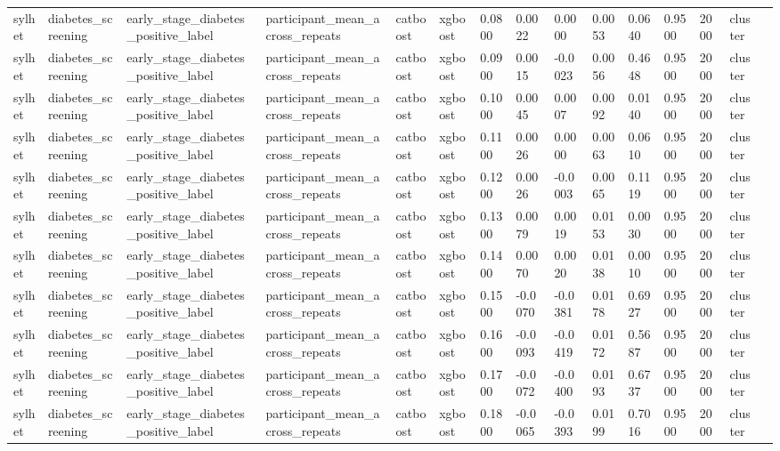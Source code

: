 \begin{tabular}{lllllllllllllll}
sylhet & diabetes\_screening & early\_stage\_diabetes\_positive\_label & participant\_mean\_across\_repeats & catboost & xgboost & 0.0800 & 0.0022 & 0.0000 & 0.0053 & 0.0640 & 0.9500 & 2000 & cluster &  \\
sylhet & diabetes\_screening & early\_stage\_diabetes\_positive\_label & participant\_mean\_across\_repeats & catboost & xgboost & 0.0900 & 0.0015 & -0.0023 & 0.0056 & 0.4648 & 0.9500 & 2000 & cluster &  \\
sylhet & diabetes\_screening & early\_stage\_diabetes\_positive\_label & participant\_mean\_across\_repeats & catboost & xgboost & 0.1000 & 0.0045 & 0.0007 & 0.0092 & 0.0140 & 0.9500 & 2000 & cluster &  \\
sylhet & diabetes\_screening & early\_stage\_diabetes\_positive\_label & participant\_mean\_across\_repeats & catboost & xgboost & 0.1100 & 0.0026 & 0.0000 & 0.0063 & 0.0610 & 0.9500 & 2000 & cluster &  \\
sylhet & diabetes\_screening & early\_stage\_diabetes\_positive\_label & participant\_mean\_across\_repeats & catboost & xgboost & 0.1200 & 0.0026 & -0.0003 & 0.0065 & 0.1119 & 0.9500 & 2000 & cluster &  \\
sylhet & diabetes\_screening & early\_stage\_diabetes\_positive\_label & participant\_mean\_across\_repeats & catboost & xgboost & 0.1300 & 0.0079 & 0.0019 & 0.0153 & 0.0030 & 0.9500 & 2000 & cluster &  \\
sylhet & diabetes\_screening & early\_stage\_diabetes\_positive\_label & participant\_mean\_across\_repeats & catboost & xgboost & 0.1400 & 0.0070 & 0.0020 & 0.0138 & 0.0010 & 0.9500 & 2000 & cluster &  \\
sylhet & diabetes\_screening & early\_stage\_diabetes\_positive\_label & participant\_mean\_across\_repeats & catboost & xgboost & 0.1500 & -0.0070 & -0.0381 & 0.0178 & 0.6927 & 0.9500 & 2000 & cluster &  \\
sylhet & diabetes\_screening & early\_stage\_diabetes\_positive\_label & participant\_mean\_across\_repeats & catboost & xgboost & 0.1600 & -0.0093 & -0.0419 & 0.0172 & 0.5687 & 0.9500 & 2000 & cluster &  \\
sylhet & diabetes\_screening & early\_stage\_diabetes\_positive\_label & participant\_mean\_across\_repeats & catboost & xgboost & 0.1700 & -0.0072 & -0.0400 & 0.0193 & 0.6737 & 0.9500 & 2000 & cluster &  \\
sylhet & diabetes\_screening & early\_stage\_diabetes\_positive\_label & participant\_mean\_across\_repeats & catboost & xgboost & 0.1800 & -0.0065 & -0.0393 & 0.0199 & 0.7016 & 0.9500 & 2000 & cluster &  \\

\end{tabular}
